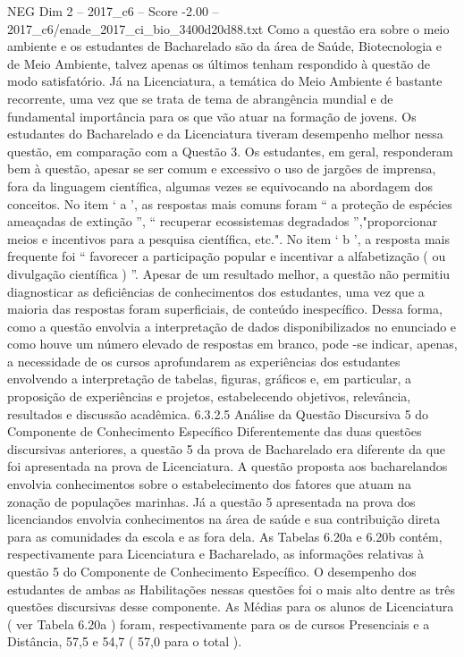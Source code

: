 \begin{textsample}{NEG Dim 2 – 2017\_c6 – Score -2.00 – 2017\_c6/enade\_2017\_ci\_bio\_3400d20d88.txt}
Como a questão era sobre o meio ambiente e os estudantes de Bacharelado são da área de Saúde, Biotecnologia e de Meio Ambiente, talvez apenas os últimos tenham respondido à questão de modo satisfatório.
Já na Licenciatura, a temática do Meio Ambiente é bastante recorrente, uma vez que se trata de tema de abrangência mundial e de fundamental importância para os que vão atuar na formação de jovens.
Os estudantes do Bacharelado e da Licenciatura tiveram desempenho melhor nessa questão, em comparação com a Questão 3.
Os estudantes, em geral, responderam bem à questão, apesar se ser comum e excessivo o uso de jargões de imprensa, fora da linguagem científica, algumas vezes se equivocando na abordagem dos conceitos.
No item ‘ a ’, as respostas mais comuns foram “ a proteção de espécies ameaçadas de extinção ”, “ recuperar ecossistemas degradados ”,"proporcionar meios e incentivos para a pesquisa científica, etc.".
No item ‘ b ’, a resposta mais frequente foi “ favorecer a participação popular e incentivar a alfabetização ( ou divulgação científica ) ”.
Apesar de um resultado melhor, a questão não permitiu diagnosticar as deficiências de conhecimentos dos estudantes, uma vez que a maioria das respostas foram superficiais, de conteúdo inespecífico.
Dessa forma, como a questão envolvia a interpretação de dados disponibilizados no enunciado e como houve um número elevado de respostas em branco, pode -se indicar, apenas, a necessidade de os cursos aprofundarem as experiências dos estudantes envolvendo a interpretação de tabelas, figuras, gráficos e, em particular, a proposição de experiências e projetos, estabelecendo objetivos, relevância, resultados e discussão acadêmica. 6.3.2.5 Análise da Questão Discursiva 5 do Componente de Conhecimento Específico Diferentemente das duas questões discursivas anteriores, a questão 5 da prova de Bacharelado era diferente da que foi apresentada na prova de Licenciatura.
A questão proposta aos bacharelandos envolvia conhecimentos sobre o estabelecimento dos fatores que atuam na zonação de populações marinhas.
Já a questão 5 apresentada na prova dos licenciandos envolvia conhecimentos na área de saúde e sua contribuição direta para as comunidades da escola e as fora dela.
As Tabelas 6.20a e 6.20b contém, respectivamente para Licenciatura e Bacharelado, as informações relativas à questão 5 do Componente de Conhecimento Específico.
O desempenho dos estudantes de ambas as Habilitações nessas questões foi o mais alto dentre as três questões discursivas desse componente.
As Médias para os alunos de Licenciatura ( ver Tabela 6.20a ) foram, respectivamente para os de cursos Presenciais e a Distância, 57,5 e 54,7 ( 57,0 para o total ).

\end{textsample}
